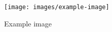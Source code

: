\documentclass{article}
\begin{document}
\begin{figure}[H]
  \centering
  \texttt{[image: images/example-image]}
  \caption{Example image}
  \label{fig:example}
\end{figure}
\end{document}
